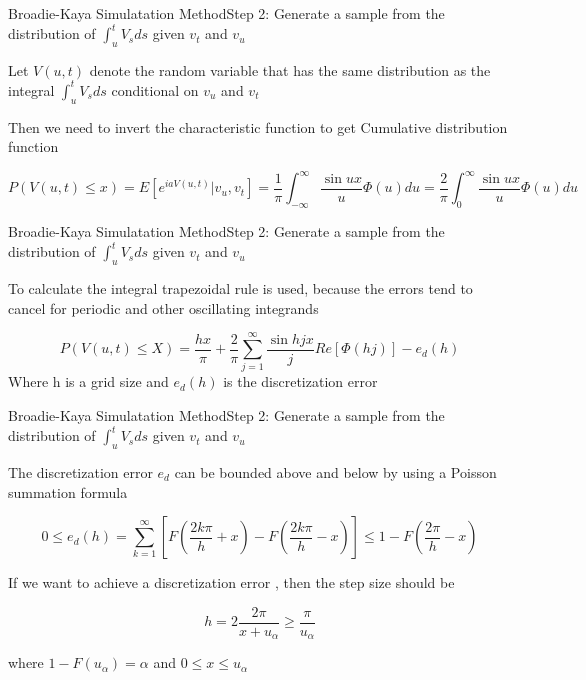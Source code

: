 \begin{frame}{Broadie-Kaya Simulatation Method}{Step 2:  Generate a sample from the distribution of $\int_{u}^t V_s ds$ given $v_t$ and $v_u$}
    
    Let $V(u,t)$  denote the random
    variable that has the same distribution as the integral $\int_{u}^t V_s ds$ conditional on $v_u$ and $v_t$
    
    Then we need to invert the characteristic function to get Cumulative distribution function
    
    \begin{equation}
        P(V(u, t) \leq x) = E\left[ e^{iaV(u,t)} \Big| v_u, v_t\right] = \frac{1}{\pi} \int_{-\infty}^\infty \frac{\sin ux}{u} \Phi(u) du = \frac{2}{\pi} \int_{0}^\infty \frac{\sin ux}{u} \Phi(u) du
    \end{equation}
    
    
\end{frame}

\begin{frame}{Broadie-Kaya Simulatation Method}{Step 2:  Generate a sample from the distribution of $\int_{u}^t V_s ds$ given $v_t$ and $v_u$}

    To calculate the integral trapezoidal rule is used, because the errors tend to cancel  for periodic and other oscillating integrands

    \begin{equation}
        P(V(u, t) \leq X) = \frac{hx}{\pi} + \frac{2}{\pi} \sum_{j=1}^\infty \frac{\sin hjx}{j} Re[\Phi(hj)] - e_d(h)
    \end{equation}
    Where h is a grid size and $e_d(h)$ is the discretization   error

\end{frame}

\begin{frame}{Broadie-Kaya Simulatation Method}{Step 2:  Generate a sample from the distribution of $\int_{u}^t V_s ds$ given $v_t$ and $v_u$}

    The discretization error $e_d$ can be bounded above and
below by using a Poisson summation formula 

    \begin{equation}
        0 \leq e_d(h) = \sum_{k=1}^\infty[ F(\frac{2k\pi}{h} + x) - F(\frac{2k\pi}{h} - x)] \leq 1 - F(\frac{2\pi}{h} - x)
    \end{equation}

    If we want to achieve a discretization error \alpha, then the
    step size should be

    \begin{equation}
        h = 2\frac{2\pi}{x+ u_\alpha} \geq \frac{\pi}{u_\alpha}
    \end{equation}

    where $1-F(u_\alpha) = \alpha$ and $0 \leq x \leq u_\alpha$


\end{frame}



